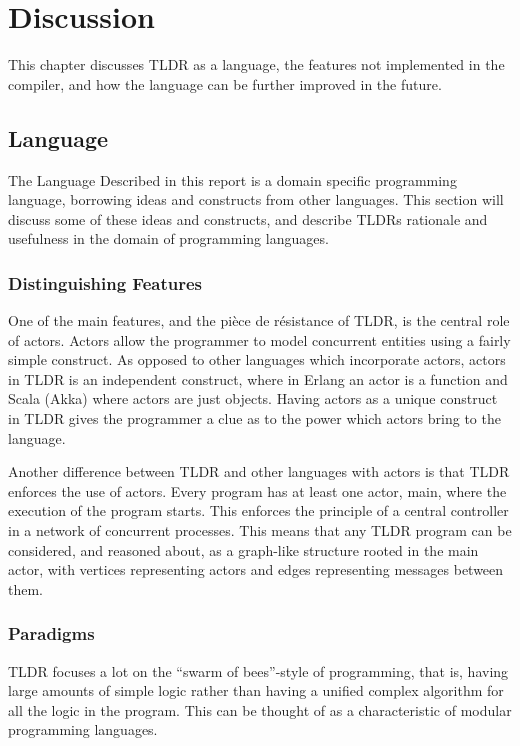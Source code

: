 \chapter{Discussion}

This chapter discusses TLDR as a language, the features not implemented in the compiler, and how the language can be further improved in the future.

\section{Language}
The Language Described in this report is a domain specific programming language, borrowing ideas and constructs from other languages. This section will discuss some of these ideas and constructs, and describe TLDRs rationale and usefulness in the domain of programming languages.

\subsection{Distinguishing Features}
One of the main features, and the pièce de résistance of TLDR, is the central role of actors. Actors allow the programmer to model concurrent entities using a fairly simple construct. As opposed to other languages which incorporate actors, actors in TLDR is an independent construct, where in Erlang an actor is a function and Scala (Akka) where actors are just objects. Having actors as a unique construct in TLDR gives the programmer a clue as to the power which actors bring to the language. 

Another difference between TLDR and other languages with actors is that TLDR enforces the use of actors. Every program has at least one actor, main, where the execution of the program starts. This enforces the principle of a central controller in a network of concurrent processes. This means that any TLDR program can be considered, and reasoned about, as a graph-like structure rooted in the main actor, with vertices representing actors and edges representing messages between them.

\subsection{Paradigms}
TLDR focuses a lot on the \enquote{swarm of bees}-style of programming, that is, having large amounts of simple logic rather than having a unified complex algorithm for all the logic in the program. This can be thought of as a characteristic of modular programming languages.

